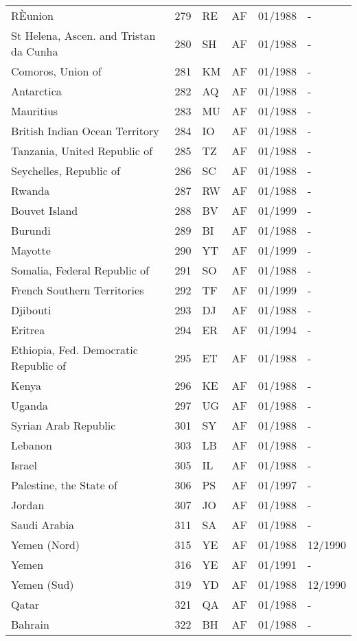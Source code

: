 \begin{small}
\begin{longtable}{p{4.3cm}p{1.5cm}p{1.5cm}p{1cm}p{2cm}p{2cm}}
RÈunion	&	279	&	RE	&	AF	&	01/1988	&	-	\\
St Helena, Ascen. and Tristan da Cunha	&	280	&	SH	&	AF	&	01/1988	&	-	\\
Comoros, Union of	&	281	&	KM	&	AF	&	01/1988	&	-	\\
Antarctica	&	282	&	AQ	&	AF	&	01/1988	&	-	\\
Mauritius	&	283	&	MU	&	AF	&	01/1988	&	-	\\
British Indian Ocean Territory	&	284	&	IO	&	AF	&	01/1988	&	-	\\
Tanzania, United Republic of	&	285	&	TZ	&	AF	&	01/1988	&	-	\\
Seychelles, Republic of	&	286	&	SC	&	AF	&	01/1988	&	-	\\
Rwanda	&	287	&	RW	&	AF	&	01/1988	&	-	\\
Bouvet Island	&	288	&	BV	&	AF	&	01/1999	&	-	\\
Burundi	&	289	&	BI	&	AF	&	01/1988	&	-	\\
Mayotte	&	290	&	YT	&	AF	&	01/1999	&	-	\\
Somalia, Federal Republic of	&	291	&	SO	&	AF	&	01/1988	&	-	\\
French Southern Territories	&	292	&	TF	&	AF	&	01/1999	&	-	\\
Djibouti	&	293	&	DJ	&	AF	&	01/1988	&	-	\\
Eritrea	&	294	&	ER	&	AF	&	01/1994	&	-	\\
Ethiopia, Fed. Democratic Republic of	&	295	&	ET	&	AF	&	01/1988	&	-	\\
Kenya	&	296	&	KE	&	AF	&	01/1988	&	-	\\
Uganda	&	297	&	UG	&	AF	&	01/1988	&	-	\\
Syrian Arab Republic	&	301	&	SY	&	AF	&	01/1988	&	-	\\
Lebanon	&	303	&	LB	&	AF	&	01/1988	&	-	\\
Israel	&	305	&	IL	&	AF	&	01/1988	&	-	\\
Palestine, the State of	&	306	&	PS	&	AF	&	01/1997	&	-	\\
Jordan	&	307	&	JO	&	AF	&	01/1988	&	-	\\
Saudi Arabia	&	311	&	SA	&	AF	&	01/1988	&	-	\\
Yemen (Nord)	&	315	&	YE	&	AF	&	01/1988	&	12/1990	\\
Yemen	&	316	&	YE	&	AF	&	01/1991	&	-	\\
Yemen (Sud)	&	319	&	YD	&	AF	&	01/1988	&	12/1990	\\
Qatar	&	321	&	QA	&	AF	&	01/1988	&	-	\\
Bahrain	&	322	&	BH	&	AF	&	01/1988	&	-	\\

\end{longtable}
\end{small}
